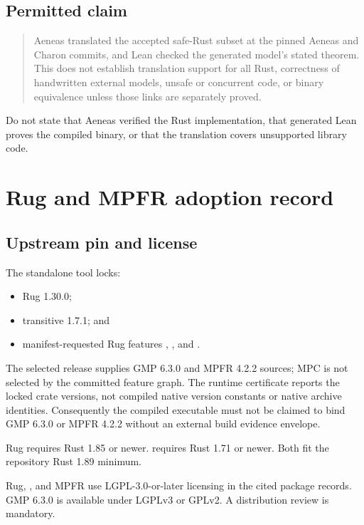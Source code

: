 \documentclass[11pt]{article}
\begin{document}
\subsection{Permitted claim}

\begin{quote}
Aeneas translated the accepted safe-Rust subset at the pinned Aeneas and Charon commits, and Lean
checked the generated model's stated theorem.  This does not establish translation support for
all Rust, correctness of handwritten external models, unsafe or concurrent code, or binary
equivalence unless those links are separately proved.
\end{quote}

Do not state that Aeneas verified the Rust implementation, that generated Lean proves the compiled
binary, or that the translation covers unsupported library code.

\section{Rug and MPFR adoption record}

\subsection{Upstream pin and license}

The standalone tool locks:
\begin{itemize}[leftmargin=*]
  \item Rug 1.30.0;
  \item transitive  1.7.1; and
  \item manifest-requested Rug features , , and .
\end{itemize}

The selected  release supplies GMP 6.3.0 and MPFR 4.2.2 sources; MPC is not
selected by the committed feature graph.  The runtime certificate reports the locked crate
versions, not compiled native version constants or native archive identities.  Consequently the
compiled executable must not be claimed to bind GMP 6.3.0 or MPFR 4.2.2 without an external build
evidence envelope.

Rug requires Rust 1.85 or newer.   requires Rust 1.71 or newer.  Both fit the
repository Rust 1.89 minimum.

Rug, , and MPFR use LGPL-3.0-or-later licensing in the cited package records.
GMP 6.3.0 is available under LGPLv3 or GPLv2.  A distribution review is mandatory.
\end{document}
